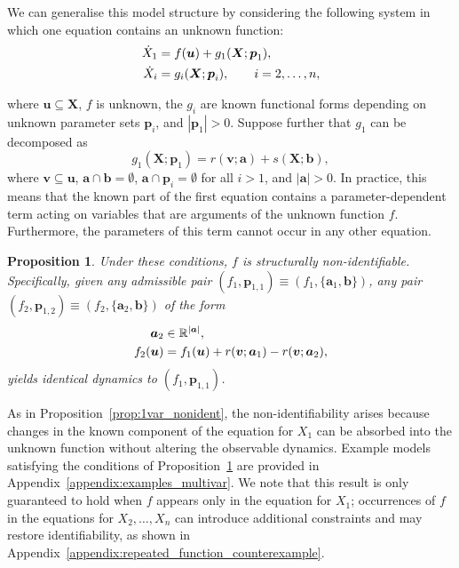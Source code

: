 \documentclass{article}
\theoremstyle{plain}
\newtheorem{proposition}{Proposition}[section]
\theoremstyle{definition}
\renewcommand{\vec}[1]{\boldsymbol{#1}}
\begin{document}
We can generalise this model structure by considering the following system in which one equation contains an unknown function:
\begin{align}
    \dot{X}_1 &= f(\vec{u}) + g_1(\vec{X};\vec{p}_1),  \label{eq:nonident_partial_system_UDEs} \\
    \dot{X}_i &= g_i(\vec{X};\vec{p}_i), \qquad i = 2,\ldots,n, \notag
\end{align}
{where $\vec{u} \subseteq \vec{X}$, $f$ is unknown, the $g_i$ are known functional forms depending on unknown parameter sets $\vec{p}_i$, and $|\vec{p}_1| > 0$. Suppose further that $g_1$ can be decomposed as
\begin{equation*}
    g_1(\vec{X};\vec{p}_1) = r(\vec{v};\vec{a}) + s(\vec{X};\vec{b}),
\end{equation*}
where $\vec{v} \subseteq \vec{u}$, $\vec{a} \cap \vec{b} = \emptyset$, $\vec{a} \cap \vec{p}_i = \emptyset$ for all $i > 1$, and $|\vec{a}| > 0$. In practice, this means that the known part of the first equation contains a parameter-dependent term acting on variables that are arguments of the unknown function $f$. Furthermore, the parameters of this term cannot occur in any other equation.

\begin{proposition} \label{prop:multivar_nonident}
Under these conditions, $f$ is structurally non-identifiable. Specifically, given any admissible pair $(f_1, \vec{p}_{1,1}) \equiv (f_1, \{\vec{a}_{1}, \vec{b}\})$, any pair $(f_2, \vec{p}_{1,2}) \equiv (f_2, \{\vec{a}_{2}, \vec{b}\})$ of the form
\begin{align}
    \vec{a}_2 &\in \mathbb{R}^{|\vec{a}|}, \notag \\
    \label{eq:multivar_nonident_expr}
    f_2(\vec{u}) &= f_1(\vec{u}) + r(\vec{v};\vec{a}_1) - r(\vec{v};\vec{a}_2),
\end{align}
yields identical dynamics to $(f_1, \vec{p}_{1,1})$.
\end{proposition}

As in Proposition~\ref{prop:1var_nonident}, the non-identifiability arises because changes in the known component of the equation for $X_1$ can be absorbed into the unknown function without altering the observable dynamics. Example models satisfying the conditions of Proposition~\ref{prop:multivar_nonident} are provided in Appendix~\ref{appendix:examples_multivar}. We note that this result is only guaranteed to hold when $f$ appears only in the equation for $X_1$; occurrences of $f$ in the equations for $X_2,\ldots,X_n$ can introduce additional constraints and may restore identifiability, as shown in Appendix~\ref{appendix:repeated_function_counterexample}. 

}
\end{document}
